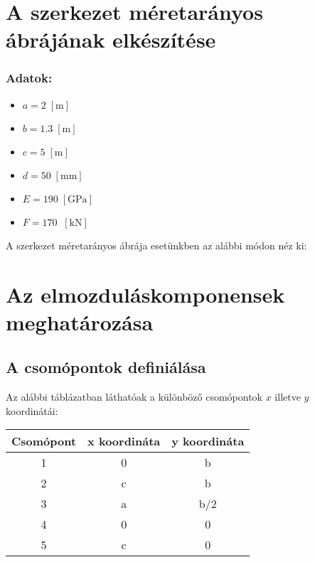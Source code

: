 \documentclass[12pt,a4paper]{article}
\def\m{\; \left[\mathrm{m}\right]}
\def\kN{\; \left[\mathrm{kN}\right]}
\begin{document}
\section{A szerkezet méretarányos ábrájának elkészítése}
\subsubsection*{Adatok:}
\begin{multicols}{2}
    \begin{itemize}
        \item $a=2 \m$
        \item $b=1.3 \m$
        \item $c=5 \m$
    \end{itemize}
    \columnbreak
    \begin{itemize}
        \item $d=50 \; \left[\mathrm{mm}\right]$
        \item $E=190 \; \left[\mathrm{GPa}\right]$
        \item $F=170 \; \kN$
    \end{itemize}
\end{multicols}
A szerkezet méretarányos ábrája esetünkben az alábbi módon néz ki:
\section{Az elmozduláskomponensek meghatározása}
\subsection{A csomópontok definiálása}
Az alábbi táblázatban láthatóak a különböző csomópontok $x$ illetve
$y$ koordinátái:
\begin{center}
    \begin{tabular}{|c|c|c|}
        \hline
        Csomópont & x koordináta & y koordináta \\
        \hline
        \hline
        1         & 0            & b            \\
        \hline
        2         & c            & b            \\
        \hline
        3         & a            & b/2          \\
        \hline
        4         & 0            & 0            \\
        \hline
        5         & c            & 0            \\
        \hline
    \end{tabular}
\end{center}
\end{document}
